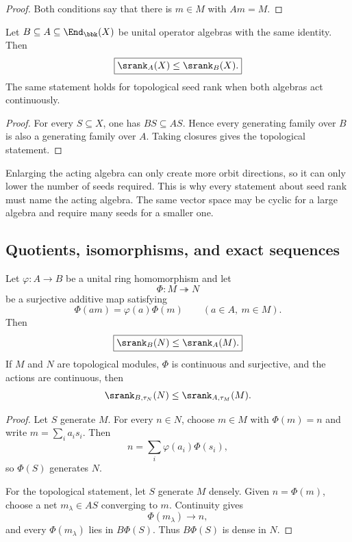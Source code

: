 \begin{proof}
Both conditions say that there is $m\in M$ with $Am=M$.
\end{proof}

\begin{proposition}
\label{prop:acting-algebra-monotonicity}
Let $B\subseteq A\subseteq\End_{\bbk}(X)$ be unital operator algebras with the same identity.  Then
\[
\boxed{\srank_A(X)\leq\srank_B(X).}
\]
The same statement holds for topological seed rank when both algebras act continuously.
\end{proposition}

\begin{proof}
For every $S\subseteq X$, one has $BS\subseteq AS$.  Hence every generating family over $B$ is also a generating family over $A$.  Taking closures gives the topological statement.
\end{proof}

\begin{interpretation}
Enlarging the acting algebra can only create more orbit directions, so it can only lower the number of seeds required.  This is why every statement about seed rank must name the acting algebra.  The same vector space may be cyclic for a large algebra and require many seeds for a smaller one.
\end{interpretation}


\subsection{Quotients, isomorphisms, and exact sequences}
\begin{theorem}
\label{thm:quotient-monotonicity}
Let $\varphi:A\to B$ be a unital ring homomorphism and let
\[
\Phi:M\twoheadrightarrow N
\]
be a surjective additive map satisfying
\[
\Phi(am)=\varphi(a)\Phi(m)
\qquad(a\in A,\ m\in M).
\]
Then
\[
\boxed{\srank_B(N)\leq\srank_A(M).}
\]
If $M$ and $N$ are topological modules, $\Phi$ is continuous and surjective, and the actions are continuous, then
\[
\srank_{B,\tau_N}(N)\leq\srank_{A,\tau_M}(M).
\]
\end{theorem}

\begin{proof}
Let $S$ generate $M$.  For every $n\in N$, choose $m\in M$ with $\Phi(m)=n$ and write $m=\sum_ia_is_i$.  Then
\[
n=\sum_i\varphi(a_i)\Phi(s_i),
\]
so $\Phi(S)$ generates $N$.

For the topological statement, let $S$ generate $M$ densely.  Given $n=\Phi(m)$, choose a net $m_\lambda\in AS$ converging to $m$.  Continuity gives
\[
\Phi(m_\lambda)\longrightarrow n,
\]
and every $\Phi(m_\lambda)$ lies in $B\Phi(S)$.  Thus $B\Phi(S)$ is dense in $N$.
\end{proof}

